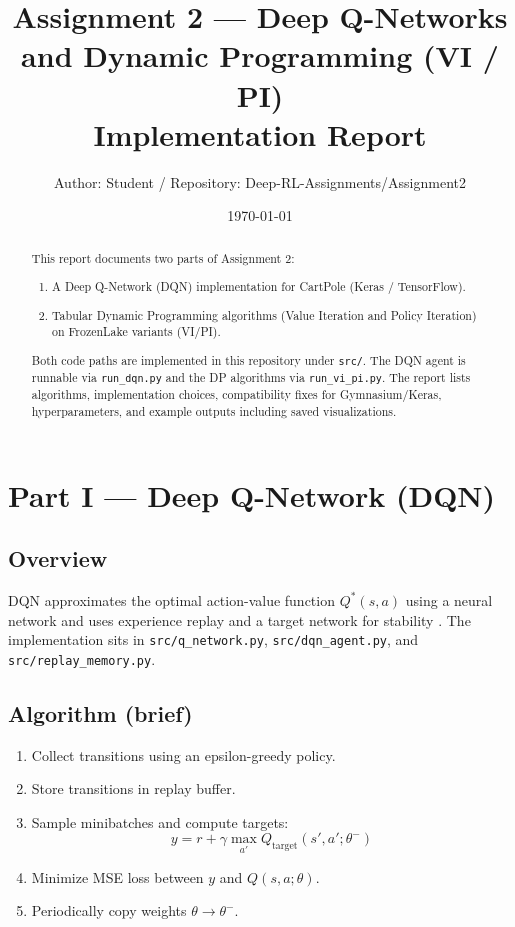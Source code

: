 \documentclass[11pt]{article}
\title{Assignment 2 — Deep Q-Networks and Dynamic Programming (VI / PI) \\ Implementation Report}
\author{Author: Student / Repository: Deep-RL-Assignments/Assignment2}
\date{\today}
\begin{document}
\maketitle

\begin{abstract}
This report documents two parts of Assignment 2:
\begin{enumerate}
  \item A Deep Q-Network (DQN) implementation for CartPole (Keras / TensorFlow).
  \item Tabular Dynamic Programming algorithms (Value Iteration and Policy Iteration) on FrozenLake variants (VI/PI).
\end{enumerate}
Both code paths are implemented in this repository under \texttt{src/}. The DQN
agent is runnable via \texttt{run\_dqn.py} and the DP algorithms via
\texttt{run\_vi\_pi.py}. The report lists algorithms, implementation choices,
compatibility fixes for Gymnasium/Keras, hyperparameters, and example outputs
including saved visualizations.
\end{abstract}

\section{Part I — Deep Q-Network (DQN)}
\subsection{Overview}
DQN approximates the optimal action-value function \(Q^*(s,a)\) using a neural
network and uses experience replay and a target network for stability
\cite{mnih2015human}. The implementation sits in \texttt{src/q\_network.py},
\texttt{src/dqn\_agent.py}, and \texttt{src/replay\_memory.py}.

\subsection{Algorithm (brief)}
\begin{enumerate}
  \item Collect transitions using an epsilon-greedy policy.
  \item Store transitions in replay buffer.
  \item Sample minibatches and compute targets:
  \[
    y = r + \gamma \max_{a'} Q_{\text{target}}(s',a';\theta^-)
  \]
  \item Minimize MSE loss between \(y\) and \(Q(s,a;\theta)\).
  \item Periodically copy weights \(\theta \to \theta^-\).
\end{enumerate}
\end{document}
